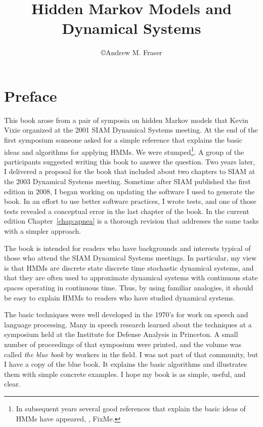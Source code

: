 \documentclass[ltxbook,showlabels]{hmmdsbook}
\author{\copyright Andrew M. Fraser}
\title{Hidden Markov Models and Dynamical Systems}
\begin{document}
\frontmatter
\maketitle

\chapter*{Preface}
\label{chap:preface}
This book arose from a pair of symposia on hidden Markov models that
Kevin Vixie organized at the 2001 SIAM Dynamical Systems meeting.  At
the end of the first symposium someone asked for a simple reference
that explains the basic ideas and algorithms for applying HMMs.  We
were stumped\footnote{In subsequent years several good references that
  explain the basic ideas of HMMs have appeared, \eg, FixMe.}.  A
group of the participants suggested writing this book to answer the
question.  Two years later, I delivered a proposal for the book that
included about two chapters to SIAM at the 2003 Dynamical Systems
meeting.  Sometime after SIAM published the first edition in 2008, I
began working on updating the software I used to generate the book.
In an effort to use better software practices, I wrote tests, and one
of those tests revealed a conceptual error in the last chapter of the
book.  In the current edition Chapter~\ref{chap:apnea} is a thorough
revision that addresses the same tasks with a simpler approach.

The book is intended for readers who have backgrounds and interests
typical of those who attend the SIAM Dynamical Systems meetings.  In
particular, my view is that HMMs are discrete state discrete time
stochastic dynamical systems, and that they are often used to
approximate dynamical systems with continuous state spaces operating
in continuous time.  Thus, by using familiar analogies, it should be
easy to explain HMMs to readers who have studied dynamical systems.

The basic techniques were well developed in the 1970's for work on
speech and language processing.  Many in speech research learned about
the techniques at a symposium held at the Institute for Defense
Analysis  in Princeton.  A small
number of proceedings of that symposium \cite{ida80} were printed, and
the volume was called \emph{the blue book} by workers in the field.  I
was not part of that community, but I have a copy of the blue book.
It explains the basic algorithms and illustrates them with simple
concrete examples.  I hope my book is as simple, useful, and clear.
\end{document}
